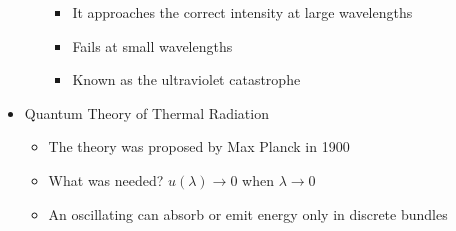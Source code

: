 \begin{itemize}
\begin{itemize}
        \begin{itemize}

          \item It approaches the correct intensity at large wavelengths

          \item Fails at small wavelengths

          \item Known as the ultraviolet catastrophe

        \end{itemize}

    \end{itemize}

  \item Quantum Theory of Thermal Radiation

    \begin{itemize}

      \item The theory was proposed by Max Planck in 1900

      \item What was needed? $u(\lambda)\to 0$ when $\lambda \to 0$

      \item An oscillating can absorb or emit energy only in discrete bundles

    \end{itemize}

\end{itemize}



